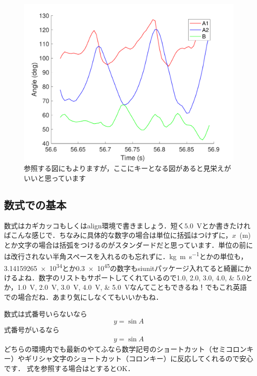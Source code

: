 \documentclass[a4j]{jsarticle}
\numberwithin{equation}{section}%
\begin{document}
\begin{figure}[tb]
 \centering %
  \includegraphics[width=\columnwidth]{./figure/testfig.pdf}
  \caption{参照する図にもよりますが，ここにキーとなる図があると見栄えがいいと思っています}
  \label{fig:test}
\end{figure}

\subsection{数式での基本}

数式はカギカッコもしくはalign環境で書きましょう．短く$5.0$~Vとか書きたければこんな感じで．ちなみに具体的な数字の場合は単位に括弧はつけずに，$x$~(m)とか文字の場合は括弧をつけるのがスタンダードだと思っています．単位の前には改行されない半角スペースを入れるのも忘れずに．\si{kg.m.s^{-1}}とかの単位も，\num{3.14159265e34}とか\num{.3e45}の数字もsiunitパッケージ入れてると綺麗にかけるよね．数字のリストもサポートしてくれているので\numlist{ 1.0; 2.0; 3.0; 4.0; 5.0}とか，\SIlist{ 1.0; 2.0; 3.0; 4.0; 5.0}{\volt}なんてこともできるね！でもこれ英語での場合だね．あまり気にしなくてもいいかもね．

数式は式番号いらないなら
\[
 y=\sin{A}
\] 
式番号がいるなら
\begin{align}
 y=\sin{A}
 \label{eq:test}
\end{align}
どちらの環境内でも最新のやてふなら数学記号のショートカット（セミコロンキー）やギリシャ文字のショートカット（コロンキー）に反応してくれるので安心です．
式を参照する場合はとするとOK．
\end{document}
